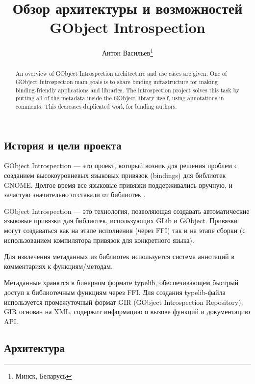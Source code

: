 \documentclass[10pt, a5paper]{article}
\begin{document}
\title{Обзор архитектуры и возможностей GObject Introspection}%

\author{Антон Васильев\footnote{Минск, Беларусь}}
\maketitle

\begin{abstract}
An overview of GObject Introspection architecture and use cases are given.
One of GObject Introspection main goals is to share binding infrastructure for making binding-friendly applications and libraries.
The introspection project solves this task by putting all of the metadata
inside the GObject library itself, using annotations in comments.
This decreases duplicated work for binding authors.
\end{abstract}

\subsection*{История и цели проекта}

GObject Introspection --- это проект, который возник для решения проблем
с созданием высокоуровневых языковых привязок (bindings) для библиотек GNOME. Долгое время все языковые привязки поддерживались вручную, и зачастую значительно отставали от библиотек \cite{Antono1}.

GObject Introspection --- это технология, позволяющая создавать
автоматические языковые привязки для библиотек, использующих GLib и
GObject.  Привязки могут создаваться как на этапе исполнения (через
FFI) так и на этапе сборки (с использованием компилятора привязок для
конкретного языка).

Для извлечения метаданных из библиотек используется система аннотаций в комментариях к функциям/методам.

Метаданные хранятся в бинарном формате typelib, обеспечивающем
быстрый доступ к библиотечным функциям через FFI. Для создания typelib-файла используется промежуточный формат GIR (GObject Introspection
Repository). GIR основан на XML, содержит информацию о вызове
функций и документацию API.

\subsection*{Архитектура}
\end{document}
